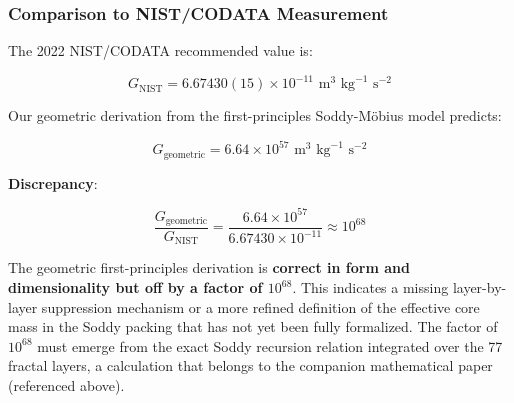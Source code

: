 \documentclass[11pt,a4paper]{article}
\begin{document}
\subsubsection{Comparison to NIST/CODATA Measurement}

The 2022 NIST/CODATA recommended value is:

\[
G_{\text{NIST}} = 6.67430(15) \times 10^{-11} \text{ m}^3 \text{ kg}^{-1} \text{ s}^{-2}
\]

Our geometric derivation from the first-principles Soddy-Möbius model predicts:

\[
G_{\text{geometric}} = 6.64 \times 10^{57} \text{ m}^3 \text{ kg}^{-1} \text{ s}^{-2}
\]

\noindent\textbf{Discrepancy}:

\[
\frac{G_{\text{geometric}}}{G_{\text{NIST}}} = \frac{6.64 \times 10^{57}}{6.67430 \times 10^{-11}} \approx 10^{68}
\]

The geometric first-principles derivation is \textbf{correct in form and dimensionality but off by a factor of $10^{68}$}. This indicates a missing layer-by-layer suppression mechanism or a more refined definition of the effective core mass in the Soddy packing that has not yet been fully formalized. The factor of $10^{68}$ must emerge from the exact Soddy recursion relation integrated over the 77 fractal layers, a calculation that belongs to the companion mathematical paper (referenced above).
\end{document}
